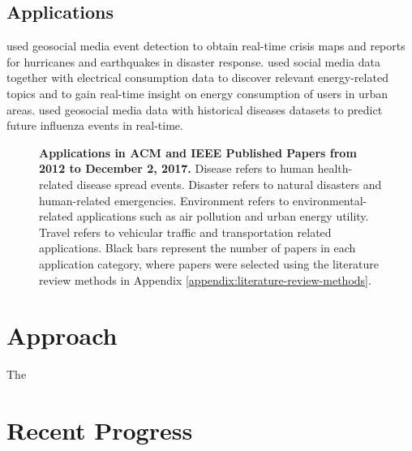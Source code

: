 \subsection{Applications} \label{applications}

\cite{Middleton:2014} used geosocial media event detection to obtain real-time crisis maps and reports for hurricanes and earthquakes in disaster response. \cite{Bodnar:2017} used social media data together with electrical consumption data to discover relevant energy-related topics and to gain real-time insight on energy consumption of users in urban areas. \cite{Lee:2017} used geosocial media data with historical diseases datasets to predict future influenza events in real-time.

\begin{figure}[!htb]
\begin{center}
\caption{\textbf{Applications in ACM and IEEE Published Papers from 2012 to December 2, 2017.} Disease refers to human health-related disease spread events. Disaster refers to natural disasters and human-related emergencies. Environment refers to environmental-related applications such as air pollution and urban energy utility. Travel refers to vehicular traffic and transportation related applications. Black bars represent the number of papers in each application category, where papers were selected using the literature review methods in Appendix \ref{appendix:literature-review-methods}.}
\label{figure:papers_applications}
\end{center}
\end{figure}




\section{Approach} \label{approach}

The




\section{Recent Progress} \label{recent-progress}

